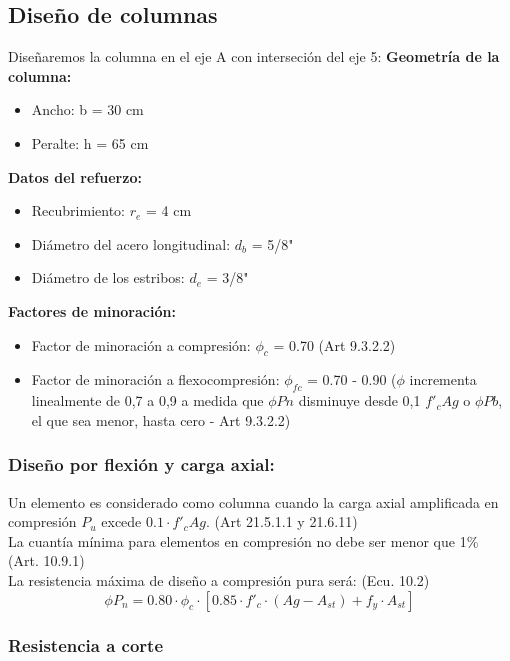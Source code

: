 \documentclass[12pt]{article}
\begin{document}
    \subsection{Diseño de columnas}
        Diseñaremos la columna en el eje A con interseción del eje 5:
        \textbf{Geometría de la columna:}
        \begin{itemize}
            \item Ancho: b = 30 cm
            \item Peralte: h = 65 cm            
        \end{itemize}
        \textbf{Datos del refuerzo:}
        \begin{itemize}
            \item Recubrimiento: $r_e$ = 4 cm
            \item Diámetro del acero longitudinal: $d_b$ = 5/8"
            \item Diámetro de los estribos: $d_e$ = 3/8"
        \end{itemize}
        \textbf{Factores de minoración:}
        \begin{itemize}
            \item Factor de minoración a compresión: $\phi_{c}$ = 0.70 (Art 9.3.2.2)
            \item Factor de minoración a flexocompresión: $\phi_{fc}$ = 0.70 - 0.90 ($\phi$ incrementa linealmente de 0,7 a 0,9 a medida que $\phi Pn$ disminuye desde 0,1 $f'_cAg$ o $\phi Pb$, el que sea menor, hasta cero - Art 9.3.2.2)
        \end{itemize}
        
        \subsubsection{Diseño por flexión y carga axial:}
        Un elemento es considerado como columna cuando la carga axial amplificada en compresión $P_u$ excede $0.1 \cdot f'_c Ag$. (Art 21.5.1.1 y 21.6.11)\\
        La cuantía mínima para elementos en compresión no debe ser menor que 1\% (Art. 10.9.1)\\
        La resistencia máxima de diseño a compresión pura será: (Ecu. 10.2)
        \[ \phi P_n = 0.80 \cdot \phi_c \cdot [0.85 \cdot f'_c \cdot (Ag - A_{st}) + f_y \cdot A_{st} ] \]

        \subsubsection{Resistencia a corte}
        

        
\end{document}
